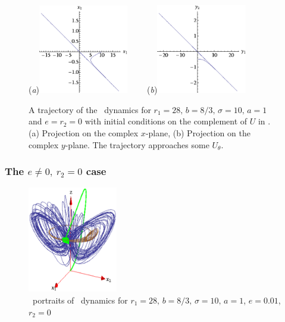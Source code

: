 \begin{figure}[t]
\begin{center}
  (\textit{a})\includegraphics[width=0.35\textwidth]{../figs/CLe0transA.eps}
~~~~(\textit{b})\includegraphics[width=0.35\textwidth]{../figs/CLe0transB.eps}
\end{center}
\caption[Transient trajectory in degenerate Complex Lorenz eq.]{ A trajectory
of the \CLe\ dynamics for $r_1=28,\, b=8/3,\, \sigma=10,\, a=1$ and $e=r_2=0$ with
initial conditions on the complement of $U$ in . (a) Projection on the
complex $x$-plane, (b) Projection on the complex $y$-plane. The trajectory
approaches some $U_\theta$.
    }
\label{fig:CLe0trans}
\end{figure}

\subsubsection{The $e\neq0,\ r_2=0$ case}

\begin{figure}[t]
\begin{center}
  \includegraphics[width=0.35\textwidth]{../figs/CLE.eps}
\end{center}
\caption[Complex Lorenz system phase space]{ \Statesp\
portraits of \CLe\ dynamics for $r_1=28,\, b=8/3,\, \sigma=10,\, a=1$, $e=0.01$, $r_2=0$}
\label{fig:CLE}
\end{figure}




